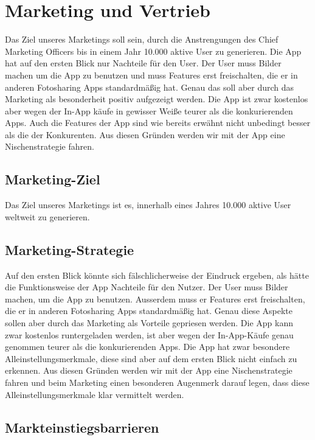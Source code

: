 \chapter{Marketing und Vertrieb}

Das Ziel unseres Marketings soll sein, durch die Anstrengungen des Chief Marketing Officers bis in einem Jahr 10.000 aktive User zu generieren.
Die App hat auf den ersten Blick nur Nachteile für den User. Der User muss Bilder machen um die App zu benutzen und muss Features erst freischalten, die er in anderen Fotosharing Apps standardmäßig hat. Genau das soll aber durch das Marketing als besonderheit positiv aufgezeigt werden.
Die App ist zwar kostenlos aber wegen der In-App käufe in gewisser Weiße teurer als die konkurierenden Apps. Auch die Features der App sind wie bereits erwähnt nicht unbedingt besser als die der Konkurenten. Aus diesen Gründen werden wir mit der App eine Nischenstrategie fahren.


\section{Marketing-Ziel}

Das Ziel unseres Marketings ist es, innerhalb eines Jahres 10.000 aktive User weltweit zu generieren.

\section{Marketing-Strategie}

Auf den ersten Blick könnte sich fälschlicherweise der Eindruck ergeben, als hätte die Funktionsweise der App Nachteile für den Nutzer. Der User muss Bilder machen, um die App zu benutzen. Ausserdem muss er Features erst freischalten, die er in anderen Fotosharing Apps standardmäßig hat. Genau diese Aspekte sollen aber durch das Marketing als Vorteile gepriesen werden.
Die App kann zwar kostenlos runtergeladen werden, ist aber wegen der In-App-Käufe genau genommen teurer als die konkurierenden Apps. Die App hat zwar besondere Alleinstellungsmerkmale, diese sind aber auf dem ersten Blick nicht einfach zu erkennen. Aus diesen Gründen werden wir mit der App eine Nischenstrategie fahren und beim Marketing einen besonderen Augenmerk darauf legen, dass diese Alleinstellungsmerkmale klar vermittelt werden.

\section{Markteinstiegsbarrieren}

